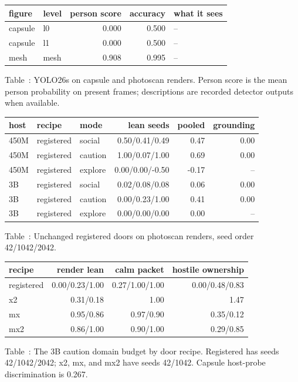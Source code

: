 \documentclass[11pt]{article}
\begin{document}
\par\medskip

\begin{center}
{\scriptsize
\setlength{\tabcolsep}{3pt}%
\begin{tabular}{llrrl}
\toprule
figure & level & person score & accuracy & what it sees \\
\midrule
capsule & l0 & 0.000 & 0.500 & -- \\
capsule & l1 & 0.000 & 0.500 & -- \\
mesh & mesh & 0.908 & 0.995 & -- \\
\bottomrule
\end{tabular}
}
\end{center}
\noindent Table~\thetable: YOLO26s on capsule and photoscan renders. Person score is the mean person probability on present frames; descriptions are recorded detector outputs when available.
\label{tab:r3detector}
\par


\begin{center}
{\scriptsize
\setlength{\tabcolsep}{3pt}%
\begin{tabular}{lllrrr}
\toprule
host & recipe & mode & lean seeds & pooled & grounding \\
\midrule
450M & registered & social & 0.50/0.41/0.49 & 0.47 & 0.00 \\
450M & registered & caution & 1.00/0.07/1.00 & 0.69 & 0.00 \\
450M & registered & explore & 0.00/0.00/-0.50 & -0.17 & -- \\
3B & registered & social & 0.02/0.08/0.08 & 0.06 & 0.00 \\
3B & registered & caution & 0.00/0.23/1.00 & 0.41 & 0.00 \\
3B & registered & explore & 0.00/0.00/0.00 & 0.00 & -- \\
\bottomrule
\end{tabular}
}
\end{center}
\noindent Table~\thetable: Unchanged registered doors on photoscan renders, seed order 42/1042/2042.
\label{tab:r3transfer}
\par


\begin{center}
{\scriptsize
\setlength{\tabcolsep}{3pt}%
\begin{tabular}{lrrr}
\toprule
recipe & render lean & calm packet & hostile ownership \\
\midrule
registered & 0.00/0.23/1.00 & 0.27/1.00/1.00 & 0.00/0.48/0.83 \\
x2 & 0.31/0.18 & 1.00 & 1.47 \\
mx & 0.95/0.86 & 0.97/0.90 & 0.35/0.12 \\
mx2 & 0.86/1.00 & 0.90/1.00 & 0.29/0.85 \\
\bottomrule
\end{tabular}
}
\end{center}
\noindent Table~\thetable: The 3B caution domain budget by door recipe. Registered has seeds 42/1042/2042; x2, mx, and mx2 have seeds 42/1042. Capsule host-probe discrimination is 0.267.
\label{tab:domain}
\par
\end{document}
